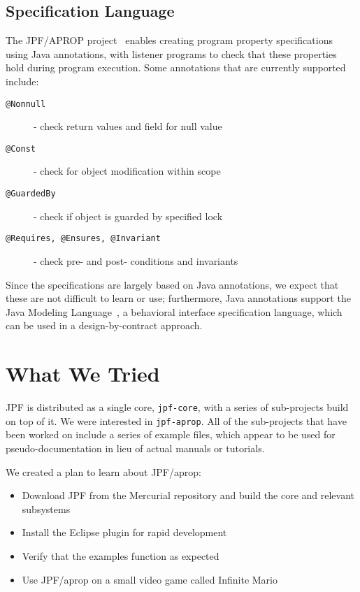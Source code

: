 \documentclass[twocolumn]{article}
\begin{document}
\subsection{Specification Language}

The JPF/APROP project~\cite{aprop} enables creating program property specifications using Java annotations, with listener programs to check that these properties hold during program execution. 
Some annotations that are currently supported include:

\begin{description}
\item[\texttt{@Nonnull}] - check 	return values and field for null value
\item[\texttt{@Const}] - check for object modification within scope
\item[\texttt{@GuardedBy}] - check if object is guarded by specified lock
\item[\texttt{@Requires, @Ensures, @Invariant}] - check pre- and post- conditions and invariants
\end{description}

Since the specifications are largely based on Java annotations, we expect that these are not difficult to learn or use; 
furthermore, Java annotations support the Java Modeling Language~\cite{DBLP:journals/sttt/BurdyCCEKLLP05}, a behavioral interface specification language, which can be used in a design-by-contract approach. 

\section{What We Tried}
JPF is distributed as a single core, \texttt{jpf-core}, with a series of sub-projects build on top of it. We were interested in \texttt{jpf-aprop}. All of the sub-projects that have been worked on include a series of example files, which appear to be used for pseudo-documentation in lieu of actual manuals or tutorials.

We created a plan to learn about JPF/aprop:
\begin{itemize}
	\item Download JPF from the Mercurial repository and build the core and relevant subsystems
	\item Install the Eclipse plugin for rapid development
	\item Verify that the examples function as expected
	\item Use JPF/aprop on a small video game called Infinite Mario
\end{itemize}
\end{document}
